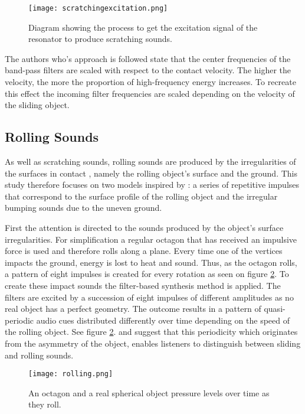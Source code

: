 \begin{figure}[H]
  \centering
    \texttt{[image: scratchingexcitation.png]}
      \caption{Diagram showing the process to get the excitation signal of the resonator to produce scratching sounds.}
      \label{fig:scratchingimpulse}
\end{figure} 

The authors who's approach is followed state that the center frequencies of the band-pass filters are scaled with respect to the contact velocity. The higher the velocity, the more the proportion of high-frequency energy increases. To recreate this effect the incoming filter frequencies are scaled depending on the velocity of the sliding object.

\subsection{Rolling Sounds}\label{sec:rolling_synth}

As well as scratching sounds, rolling sounds are produced by the irregularities of the surfaces in contact \cite{van2001foleyautomatic}, namely the rolling object's surface and the ground. This study therefore focuses on two models inspired by \cite{farnell2010designing}: a series of repetitive impulses that correspond to the surface profile of the rolling object and the irregular bumping sounds due to the uneven ground.

First the attention is directed to the sounds produced by the object's surface irregularities. For simplification a regular octagon that has received an impulsive force is used and therefore rolls along a plane. Every time one of the vertices impacts the ground, energy is lost to heat and sound. Thus, as the octagon rolls, a pattern of eight impulses is created for every rotation as seen on figure \ref{fig:rolling}. To create these impact sounds the filter-based synthesis method is applied. The filters are excited by a succession of eight impulses of different amplitudes as no real object has a perfect geometry. The outcome results in a pattern of quasi-periodic audio cues distributed differently over time depending on the speed of the rolling object. See figure \ref{fig:rolling}. \cite{houben1999auditory} and \cite{rath2003expressive} suggest that this periodicity which originates from the asymmetry of the object, enables listeners to distinguish between sliding and rolling sounds.


\begin{figure}[H]
  \centering
    \texttt{[image: rolling.png]}
      \caption{An octagon and a real spherical object pressure levels over time as they roll.}
      \label{fig:rolling}
\end{figure} 

